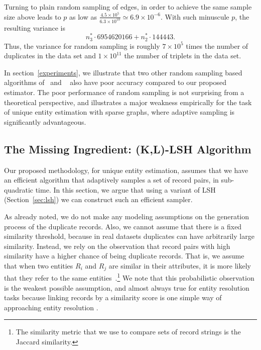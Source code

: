 \documentclass{imsart}
\begin{document}
Turning to plain random sampling of edges, in order to achieve the same sample size above leads to $p$ as low as $\frac{4.5 \times 10^5}{6.3 \times 10^{10}} \simeq 6.9 \times 10^{-6}$. With such minuscule $p$, the resulting variance is $$n_3^* \cdot 6954620166 + n_2^*\cdot 144443.$$ Thus, the variance for random sampling is roughly $7 \times 10^{5}$ times the number of duplicates in the data set and $1 \times 10^{11}$ the number of triplets in the data set.

In section~\ref{experiments}, we illustrate that two other random sampling based algorithms of~\cite{chazelle2005approximating} and ~\cite{1978paper} also have poor accuracy compared to our proposed estimator. The poor performance of random sampling is not surprising from a theoretical perspective, and illustrates a major weakness empirically for the task of unique entity estimation with sparse graphs, where adaptive sampling is significantly advantageous.

\subsection{The Missing Ingredient: (K,L)-LSH Algorithm}
\label{sec:missingVariant}
Our proposed methodology, for unique entity estimation, assumes that we have an efficient algorithm that adaptively samples a set of record pairs, in sub-quadratic time. In this section, we argue that using a variant of LSH (Section~\ref{sec:lsh}) we can construct such an efficient sampler.

As already noted, we do not make any modeling assumptions on the generation process of the duplicate records. Also, we cannot assume that there is a fixed similarity threshold, because in real datasets duplicates can have arbitrarily large similarity. Instead, we rely on the observation that record pairs with high similarity have a higher chance of being duplicate records.  That is, we assume that when two  entities $R_i$ and $R_j$ are similar in their attributes, it is more likely that they refer to the same entities~\citep{christen_2012}.\footnote{The similarity metric that we use to compare sets of record strings is the Jaccard similarity.} We note that this probabilistic observation is the weakest possible assumption, and almost always true for entity resolution tasks because linking records by a similarity score is one simple way of approaching entity resolution \citep{christen_2012, winkler_2006, fellegi_1969}.
\end{document}
